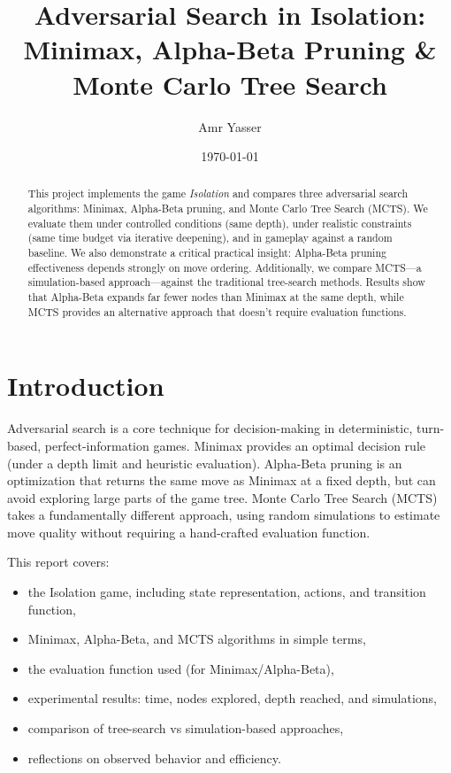 \documentclass[11pt]{article}
\title{Adversarial Search in Isolation:\\Minimax, Alpha-Beta Pruning \& Monte Carlo Tree Search}
\author{Amr Yasser}
\date{\today}
\begin{document}
\maketitle

\begin{abstract}
This project implements the game \textit{Isolation} and compares three adversarial search algorithms:
Minimax, Alpha-Beta pruning, and Monte Carlo Tree Search (MCTS). We evaluate them under controlled conditions (same depth),
under realistic constraints (same time budget via iterative deepening), and in gameplay against a
random baseline. We also demonstrate a critical practical insight: Alpha-Beta pruning effectiveness
depends strongly on move ordering. Additionally, we compare MCTS---a simulation-based approach---against
the traditional tree-search methods. Results show that Alpha-Beta expands far fewer nodes than
Minimax at the same depth, while MCTS provides an alternative approach that doesn't require evaluation functions.
\end{abstract}

\section{Introduction}
Adversarial search is a core technique for decision-making in deterministic, turn-based, perfect-information games.
Minimax provides an optimal decision rule (under a depth limit and heuristic evaluation).
Alpha-Beta pruning is an optimization that returns the same move as Minimax at a fixed depth, but can avoid
exploring large parts of the game tree. Monte Carlo Tree Search (MCTS) takes a fundamentally different approach,
using random simulations to estimate move quality without requiring a hand-crafted evaluation function.

This report covers:
\begin{itemize}
  \item the Isolation game, including state representation, actions, and transition function,
  \item Minimax, Alpha-Beta, and MCTS algorithms in simple terms,
  \item the evaluation function used (for Minimax/Alpha-Beta),
  \item experimental results: time, nodes explored, depth reached, and simulations,
  \item comparison of tree-search vs simulation-based approaches,
  \item reflections on observed behavior and efficiency.
\end{itemize}
\end{document}
